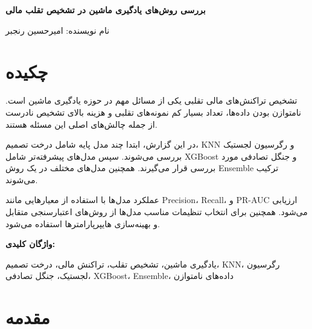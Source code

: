 \documentclass[10pt,a4paper,twocolumn]{article}
\begin{document}

\begin{center}

\vspace{0.7cm}

{\Large\textbf{
بررسی روش‌های یادگیری ماشین در تشخیص تقلب مالی
}}

\vspace{0.5cm}

{\small
نام نویسنده: امیرحسین رنجبر
}

\vspace{0.15cm}

\end{center}

\vspace{0.3cm}


\section*{چکیده}

تشخیص تراکنش‌های مالی تقلبی یکی از مسائل مهم در حوزه
یادگیری ماشین است. نامتوازن بودن داده‌ها، تعداد بسیار کم
نمونه‌های تقلبی و هزینه بالای تشخیص نادرست از جمله چالش‌های
اصلی این مسئله هستند.

در این گزارش، ابتدا چند مدل پایه شامل درخت تصمیم،
KNN و رگرسیون لجستیک بررسی می‌شوند. سپس مدل‌های پیشرفته‌تر
شامل XGBoost و جنگل تصادفی مورد بررسی قرار می‌گیرند.
همچنین مدل‌های مختلف در یک روش Ensemble ترکیب می‌شوند.

عملکرد مدل‌ها با استفاده از معیارهایی مانند Precision،
Recall،  و PR-AUC ارزیابی می‌شود. همچنین برای
انتخاب تنظیمات مناسب مدل‌ها از روش‌های اعتبارسنجی متقابل
و بهینه‌سازی هایپرپارامترها استفاده می‌شود.

\textbf{واژگان کلیدی:}

یادگیری ماشین، تشخیص تقلب، تراکنش مالی، درخت تصمیم،
KNN، رگرسیون لجستیک، جنگل تصادفی، XGBoost، Ensemble،
داده‌های نامتوازن


\section{مقدمه}
\end{document}
